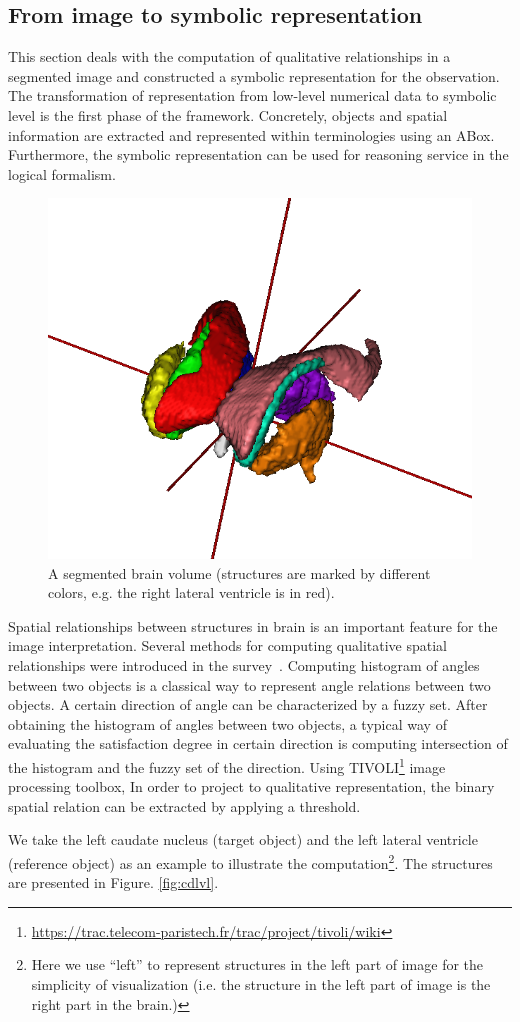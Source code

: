 \documentclass{article}
\begin{document}
\subsection{From image to symbolic representation}
 This section deals with the computation of qualitative relationships in a segmented image and constructed a symbolic representation for the observation. 
The transformation of representation from low-level numerical data to symbolic level is the first phase of the framework.
Concretely, objects and spatial information are extracted and represented within terminologies using an ABox.
Furthermore, the symbolic representation can be used for  reasoning service in the logical formalism.

\begin{figure}[h]
 \centering
 \includegraphics[width=.3\textwidth]{./figures/mesh_all_vue_45.png}
 \caption{\label{fig:brain3d}A segmented brain volume (structures are marked by different colors, e.g. the right lateral ventricle is in red).}
\end{figure}


Spatial relationships between structures in brain is an important feature for the image interpretation. 
Several methods for computing qualitative spatial relationships were introduced in the survey~\cite{Bloch2005fuzzy}.
Computing histogram of angles between two objects is a classical way to represent angle relations between two objects.
A certain direction of angle can be characterized by a fuzzy set.
After obtaining the histogram of angles between two objects, a typical way of evaluating the satisfaction degree in certain
direction is computing intersection of the histogram and the fuzzy set of the direction.
Using TIVOLI\footnote{\url{https://trac.telecom-paristech.fr/trac/project/tivoli/wiki}} image processing toolbox,
In order to project to qualitative representation, the binary spatial relation can be extracted by applying a threshold.

We take the left caudate nucleus (target object) and the left lateral ventricle (reference object) as an example to illustrate the computation\footnote{Here we use ``left'' to represent 
structures in the left part of image for the simplicity of visualization (i.e. the structure in the left part of image is the right part in the brain.)}.
The structures are presented in Figure. \ref{fig:cdlvl}.
\end{document}
